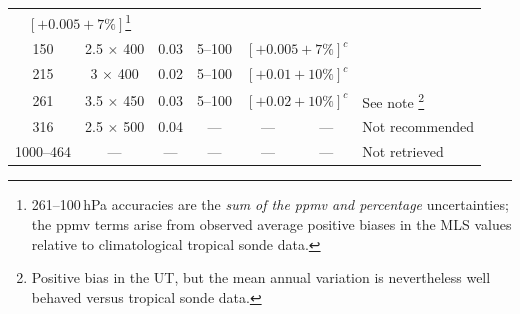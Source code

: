 \begin{table}
\begin{minipage}{\linewidth}
\begin{tabular}{cccccc>{\raggedright}p{1.8in}}
        \multicolumn{2}{c}{$\left[+0.005 +7\%\right]$\footnote{261--100\,hPa accuracies are the \emph{sum of the ppmv
            and percentage} uncertainties; the ppmv terms arise
            from observed average positive biases in the MLS values
            relative to climatological tropical sonde data.}}\tabularnewline
    150 & 2.5 $\times$ 400 & 0.03 & 5--100 &
        \multicolumn{2}{c}{$\left[+0.005 +7\%\right]^c$}\tabularnewline
    215 & 3 $\times$ 400 & 0.02 & 5--100 &
        \multicolumn{2}{c}{$\left[+0.01 +10\%\right]^c$}\tabularnewline
    261 & 3.5 $\times$ 450 & 0.03 & 5--100 &
        \multicolumn{2}{c}{$\left[+0.02 +10\%\right]^c$} & See note%
    \footnote{Positive bias in the UT, but the mean annual variation
      is nevertheless well behaved versus tropical sonde
      data.}\tabularnewline 316 & 2.5 $\times$ 500 & 0.04 & --- & ---
    & --- & Not recommended \tabularnewline 1000--464 & --- & --- &
    --- & --- & --- & Not retrieved \tabularnewline \bottomrule
\end{tabular}
  \end{minipage}
\end{table}
